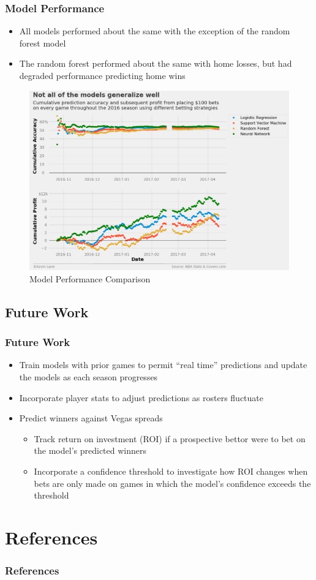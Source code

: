\documentclass{beamer}
\begin{document}
\begin{frame}
\frametitle{Model Performance}
\begin{itemize}
    \item All models performed about the same with the exception of the random forest model
    \item The random forest performed about the same with home losses, but had degraded performance predicting home wins
\end{itemize}
\begin{figure}
\includegraphics[scale=0.35]{../docs/assets/images/model-performance/model-performance-comparison.png}
\caption{Model Performance Comparison}
\end{figure}
\end{frame}

\subsection{Future Work}
\begin{frame}[t]
\frametitle{Future Work}
\begin{itemize}
    \item Train models with prior games to permit ``real time'' predictions and update the models as each season progresses
    \item Incorporate player stats to adjust predictions as rosters fluctuate
    \item Predict winners against Vegas spreads
    \begin{itemize}
        \item Track return on investment (ROI) if a prospective bettor were to bet on the model's predicted winners
        \item Incorporate a confidence threshold to investigate how ROI changes when bets are only made on games in which the model's confidence exceeds the threshold
    \end{itemize}
\end{itemize}
\end{frame}

\section{References}

\begin{frame}[t, allowframebreaks]
\frametitle{References}
\printbibliography
\end{frame}
\end{document}
